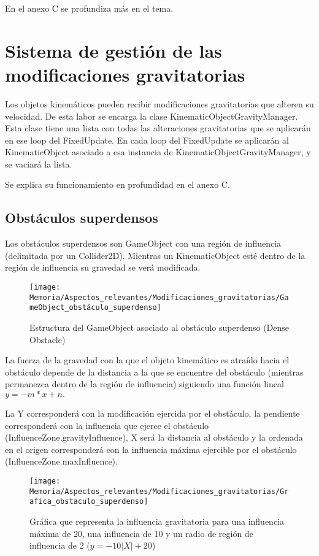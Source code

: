 En el anexo C se profundiza más en el tema.

\section{Sistema de gestión de las modificaciones gravitatorias}
Los objetos kinemáticos pueden recibir modificaciones gravitatorias que alteren su velocidad. De esta labor se encarga la clase KinematicObjectGravityManager.\\
Esta clase tiene una lista con todas las alteraciones gravitatorias que se aplicarán en ese loop del FixedUpdate. En cada loop del FixedUpdate se aplicarán al KinematicObject asociado a esa instancia de KinematicObjectGravityManager, y se vaciará la lista.

Se explica su funcionamiento en profundidad en el anexo C.

\subsection{Obstáculos superdensos}
Los obstáculos superdensos son GameObject con una región de influencia (delimitada por un Collider2D). Mientras un KinematicObject esté dentro de la región de influencia su gravedad se verá modificada.

\begin{figure}[h]
\centering
\texttt{[image: Memoria/Aspectos\_relevantes/Modificaciones\_gravitatorias/GameObject\_obstáculo\_superdenso]}
\caption{Estructura del GameObject asociado al obstáculo superdenso (Dense Obstacle)}
\end{figure}

La fuerza de la gravedad con la que el objeto kinemático es atraído hacia el obstáculo depende de la distancia a la que se encuentre del obstáculo (mientras permanezca dentro de la región de influencia) siguiendo una función lineal $y=-m*x+n.$

La Y corresponderá con la modificación ejercida por el obstáculo, la pendiente corresponderá con la influencia que ejerce el obstáculo (InfluenceZone.gravityInfluence), X será la distancia al obstáculo y la ordenada en el origen corresponderá con la influencia máxima ejercible por el obstáculo (InfluenceZone.maxInfluence).

\begin{figure}[h]
\centering
\texttt{[image: Memoria/Aspectos\_relevantes/Modificaciones\_gravitatorias/Grafica\_obstaculo\_superdenso]}
\caption{Gráfica que representa la influencia gravitatoria para una influencia máxima de 20, una influencia de 10 y un radio de región de influencia de 2 ($y = -10|X| + 20$)}
\end{figure}
\clearpage

